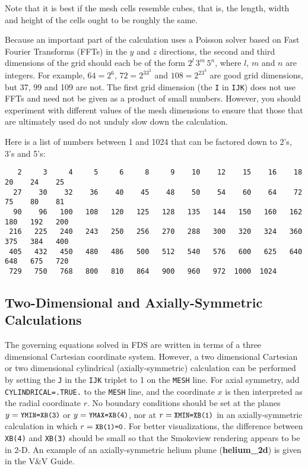 \documentclass[11pt]{book}
\newcommand{\ct}{\tt\small}
\begin{document}
\begin{warning}
\noindent
Note that it is best if the mesh cells resemble cubes, that is, the
length, width and height of the cells ought to be roughly the same.
\end{warning}

\noindent
Because an important part of the calculation uses a Poisson solver based on
Fast Fourier Transforms (FFTs) in the $y$ and $z$ directions, the second and third dimensions
of the grid should each be of the form $2^l \, 3^m \, 5^n$, where
$l$, $m$ and $n$ are integers. For example,
$64=2^6$, $72=2^33^2$ and $108=2^23^3$ are good grid dimensions, but 37, 99 and 109 are not.
The first grid dimension (the {\ct I} in {\ct IJK})  does not use FFTs and need not be given as a
product of small numbers. However, you should experiment with different values of the mesh
dimensions to ensure that those that are ultimately used do not unduly slow down the calculation.

Here is a list of numbers between 1 and 1024 that can be factored
down to 2's, 3's and 5's:

\footnotesize
\begin{verbatim}
   2     3     4     5     6     8     9    10    12    15    16    18    20    24    25
  27    30    32    36    40    45    48    50    54    60    64    72    75    80    81
  90    96   100   108   120   125   128   135   144   150   160   162   180   192   200
 216   225   240   243   250   256   270   288   300   320   324   360   375   384   400
 405   432   450   480   486   500   512   540   576   600   625   640   648   675   720
 729   750   768   800   810   864   900   960   972  1000  1024
\end{verbatim}
\normalsize


\subsection{Two-Dimensional and Axially-Symmetric Calculations}
\label{info:2D}

The governing equations solved in FDS are written in terms of a
three dimensional Cartesian coordinate system. However,
a two dimensional Cartesian or two dimensional cylindrical
(axially-symmetric) calculation can be performed by setting the {\ct J} in the {\ct IJK} triplet
to 1 on the {\ct MESH} line. For axial symmetry, add {\ct CYLINDRICAL=.TRUE.} to the
{\ct MESH} line, and the coordinate $x$ is then interpreted as the radial coordinate $r$.
No boundary conditions should be set at the planes $y=\hbox{\ct YMIN=XB(3)}$ or
$y=\hbox{\ct YMAX=XB(4)}$, nor at $r=\hbox{\ct XMIN=XB(1)}$ in an axially-symmetric
calculation in which $r=\hbox{\ct XB(1)=0}$. For better visualizations, the difference between
{\ct XB(4)} and {\ct XB(3)} should be small so that the Smokeview rendering appears to be in 2-D.
An example of an axially-symmetric helium plume ({\bf helium\_2d}) is given in the V\&V Guide.
\end{document}

